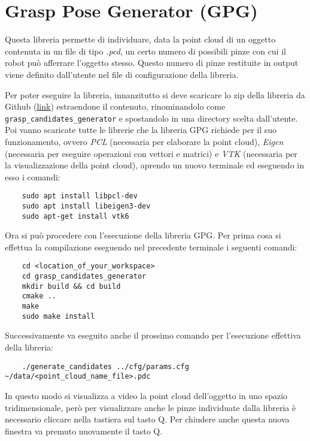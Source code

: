 \documentclass{report}
\begin{document}
\section{Grasp Pose Generator (GPG)}\label{GPG}
Questa libreria permette di individuare, data la point cloud di un oggetto contenuta in un file di tipo \textit{.pcd}, un certo numero di possibili pinze con cui il robot può afferrare l'oggetto stesso. Questo numero di pinze restituite in output viene definito dall'utente nel file di configurazione della libreria. \par
Per poter eseguire la libreria, innanzitutto si deve scaricare lo zip della libreria da Github (\textcolor{blue}{\underline{\href{https://github.com/atenpas/gpg}{link}}}) estraendone il contenuto, rinominandolo come \texttt{grasp\_candidates\_generator} e spostandolo in una directory scelta dall'utente. Poi vanno scaricate tutte le librerie che la libreria GPG richiede per il suo funzionamento, ovvero \textit{PCL} (necessaria per elaborare la point cloud), \textit{Eigen} (necessaria per eseguire operazioni con vettori e matrici) e \textit{VTK} (necessaria per la visualizzazione della point cloud), aprendo un nuovo terminale ed eseguendo in esso i comandi:
\begin{verbatim}
	sudo apt install libpcl-dev
	sudo apt install libeigen3-dev
	sudo apt-get install vtk6
\end{verbatim}
Ora si può procedere con l'esecuzione della libreria GPG. Per prima cosa si effettua la compilazione eseguendo nel precedente terminale i seguenti comandi:
\begin{verbatim}
	cd <location_of_your_workspace>  
	cd grasp_candidates_generator
	mkdir build && cd build
	cmake ..
	make
	sudo make install
\end{verbatim}
Successivamente va eseguito anche il prossimo comando per l'esecuzione effettiva della libreria:
\begin{verbatim}
	./generate_candidates ../cfg/params.cfg ~/data/<point_cloud_name_file>.pdc
\end{verbatim}
In questo modo si visualizza a video la point cloud dell'oggetto in uno spazio tridimensionale, però per visualizzare anche le pinze individuate dalla libreria è necessario cliccare nella tastiera sul tasto Q. Per chiudere anche questa nuova finestra va premuto nuovamente il tasto Q.
\end{document}
